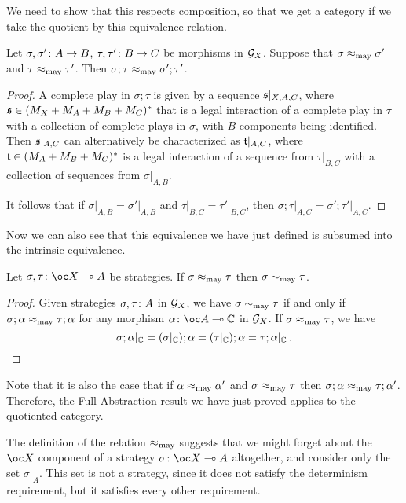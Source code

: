 \documentclass{article}
\begin{document}
We need to show that this respects composition, so that we get a category if we take the quotient by this equivalence relation.
\begin{proposition}
  Let $\sigma,\sigma' \colon A \to B$, $\tau,\tau'\colon B \to C$ be morphisms in $\mathcal G_X$.
  Suppose that $\sigma\approx_{\operatorname{may}}\sigma'$ and $\tau\approx_{\operatorname{may}}\tau'$.  
  Then $\sigma;\tau \approx_{\operatorname{may}} \sigma';\tau'$.
\end{proposition}
\begin{proof}
  A complete play in $\sigma;\tau$ is given by a sequence $\mathfrak s\vert_{X,A,C}$, where $\mathfrak s\in (M_X + M_A + M_B + M_C)^*$ that is a legal interaction of a complete play in $\tau$ with a collection of complete plays in $\sigma$, with $B$-components being identified.
  Then $\mathfrak s\vert_{A,C}$ can alternatively be characterized as $\mathfrak t\vert_{A,C}$, where $\mathfrak t\in (M_A + M_B + M_C)^*$ is a legal interaction of a sequence from $\tau\vert_{B,C}$ with a collection of sequences from $\sigma\vert_{A,B}$.  

  It follows that if $\sigma\vert_{A,B}=\sigma'\vert_{A,B}$ and $\tau\vert_{B,C}=\tau'\vert_{B,C}$, then $\sigma;\tau\vert_{A,C} = \sigma';\tau'\vert_{A,C}$.
\end{proof}

Now we can also see that this equivalence we have just defined is subsumed into the intrinsic equivalence.
\begin{proposition}
  Let $\sigma,\tau\from \oc X \implies A$ be strategies.  
  If $\sigma\approx_{\operatorname{may}}\tau$ then $\sigma\sim_{\operatorname{may}} \tau$.
\end{proposition}
\begin{proof}
  Given strategies $\sigma,\tau\colon A$ in $\mathcal G_X$, we have $\sigma \sim_{\operatorname{may}} \tau$ if and only if $\sigma;\alpha\approx_{\operatorname{may}}\tau;\alpha$ for any morphism $\alpha\from \oc A \implies \bC$ in $\mathcal G_X$.
  If $\sigma\approx_{\operatorname{may}}\tau$, we have
  \[
    \sigma;\alpha\vert_{\mathbb{C}} = (\sigma\vert_{\mathbb{C}});\alpha = (\tau\vert_{\mathbb{C}});\alpha = \tau;\alpha\vert_{\mathbb{C}}\,.\qedhere
    \]
\end{proof}

Note that it is also the case that if $\alpha\approx_{\operatorname{may}}\alpha'$ and $\sigma\approx_{\operatorname{may}}\tau$ then $\sigma;\alpha \approx_{\operatorname{may}} \tau;\alpha'$.  
Therefore, the Full Abstraction result we have just proved applies to the quotiented category.

The definition of the relation $\approx_{\operatorname{may}}$ suggests that we might forget about the $\oc X$ component of a strategy $\sigma\from\oc X \implies A$ altogether, and consider only the set $\sigma\vert_A$.  
This set is not a strategy, since it does not satisfy the determinism requirement, but it satisfies every other requirement.
\end{document}
